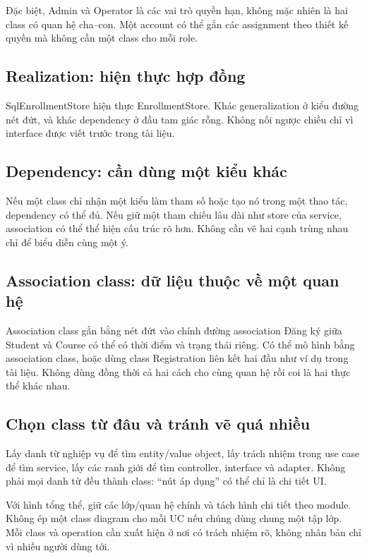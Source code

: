 Đặc biệt, Admin và Operator là các vai trò quyền hạn, không mặc nhiên là hai class có quan hệ cha--con. Một account có thể gắn các assignment theo thiết kế quyền mà không cần một class cho mỗi role.

\subsection{Realization: hiện thực hợp đồng}
SqlEnrollmentStore hiện thực EnrollmentStore. Khác generalization ở kiểu đường nét đứt, và khác dependency ở đầu tam giác rỗng. Không nối ngược chiều chỉ vì interface được viết trước trong tài liệu.

\subsection{Dependency: cần dùng một kiểu khác}
Nếu một class chỉ nhận một kiểu làm tham số hoặc tạo nó trong một thao tác, dependency có thể đủ. Nếu giữ một tham chiếu lâu dài như store của service, association có thể thể hiện cấu trúc rõ hơn. Không cần vẽ hai cạnh trùng nhau chỉ để biểu diễn cùng một ý.

\subsection{Association class: dữ liệu thuộc về một quan hệ}
  {Association class gắn bằng nét đứt vào chính đường association}
Đăng ký giữa Student và Course có thể có thời điểm và trạng thái riêng. Có thể mô hình bằng association class, hoặc dùng class Registration liên kết hai đầu như ví dụ trong tài liệu. Không dùng đồng thời cả hai cách cho cùng quan hệ rồi coi là hai thực thể khác nhau.

\subsection{Chọn class từ đâu và tránh vẽ quá nhiều}
Lấy danh từ nghiệp vụ để tìm entity/value object, lấy trách nhiệm trong use case để tìm service, lấy các ranh giới để tìm controller, interface và adapter. Không phải mọi danh từ đều thành class: ``nút áp dụng'' có thể chỉ là chi tiết UI.

Với hình tổng thể, giữ các lớp/quan hệ chính và tách hình chi tiết theo module. Không ép một class diagram cho mỗi UC nếu chúng dùng chung một tập lớp. Mỗi class và operation cần xuất hiện ở nơi có trách nhiệm rõ, không nhân bản chỉ vì nhiều người dùng tới.
